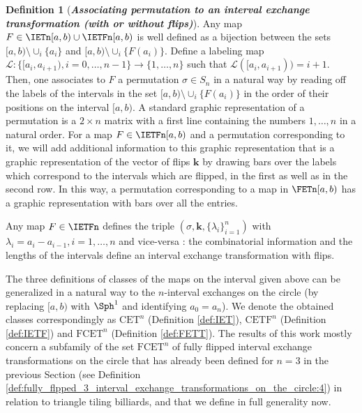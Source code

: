\documentclass[12pt]{article}
\theoremstyle{definition}
\newtheorem{definition}{Definition}
\begin{document}
\begin{definition}[\emph{\textbf{Associating permutation to an interval exchange transformation (with or without flips)}}]\label{def:permutation}
Any map $F \in \IETn [a,b) \cup \IETFn[a,b) $ is well defined as a bijection between the sets $[a,b)  \setminus \cup_i \{a_i\}$ and $[a,b)  \setminus \cup_i \{F(a_i)\}$. Define a labeling map $\mathcal{L}: \{ [a_{i}, a_{i+1}), i=0, \ldots, n-1\} \rightarrow \{1, \ldots, n\}$ such that $\mathcal{L} ([a_i, a_{i+1}))=i+1$. Then, one associates to $F$ a permutation $\sigma \in S_n$ in a natural way by reading off the labels of the intervals in the set $[a,b) \setminus \cup_i \{F(a_i)\}$ in the order of their positions on the interval $[a,b) $. 
A standard graphic representation of a permutation is a $2 \times n$ matrix with a first line containing the numbers $1, \ldots, n$ in a natural order. For a map $F \in \IETFn [a,b) $ and a permutation corresponding to it, we will add additional information to this graphic representation that is a graphic representation of the vector of flips $\textbf{k}$ by drawing bars over the labels which correspond to the intervals which are flipped, in the first as well as in the second row. In this way, a permutation corresponding to a map in $\FETn [a,b) $ has a graphic representation with bars over all the entries.
\end{definition}

Any map $F \in \IETFn$ defines the triple $(\sigma, \textbf{k}, \{\lambda_i\}_{i=1}^n)$ with $\lambda_i=a_i-a_{i-1}, i=1, \ldots, n$ and vice-versa : the combinatorial information and the lengths of the intervals define an interval exchange transformation with flips.

\smallskip

The three definitions of classes of the maps on the interval given above can be generalized in a natural way to the $n$-interval exchanges on the circle (by replacing $[a,b) $ with $\Sph^1$ and identifying $a_0=a_n$). We denote the obtained classes correspondingly as $\mathrm{CET}^n$ (Definition \ref{def:IET}), $\mathrm{CETF}^n$ (Definition \ref{def:IETF}) and $\mathrm{FCET}^n$ (Definition \ref{def:FETT}). The results of this work mostly concern a subfamily of the set $\mathrm{FCET}^n$ of fully flipped interval exchange transformations on the circle that has already been defined for $n=3$ in the previous Section (see Definition \ref{def:fully_flpped_3_interval_exchange_transformations_on_the_circle:4}) in relation to triangle tiling billiards, and that we define in full generality now.
\end{document}
